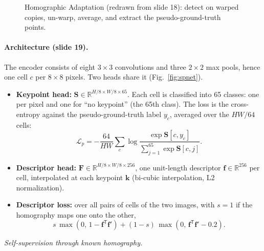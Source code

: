 \documentclass[11pt,a4paper]{article}
\newcommand{\R}{\mathbb{R}}
\newcommand{\tr}{^{\mathsf T}}
\newcommand{\y}{\bm{y}}
\theoremstyle{definition}
\theoremstyle{plain}
\theoremstyle{remark}
\begin{document}
\begin{figure}[H]
\centering
{}
\caption{Homographic Adaptation (redrawn from slide 18): detect on warped copies, un-warp, average, and extract the pseudo-ground-truth points.}
\end{figure}

\paragraph{Architecture (slide 19).}
The encoder consists of eight $3\times3$ convolutions and three $2\times2$ max pools, hence one cell $c$ per $8\times8$ pixels. Two heads share it
(Fig.~\ref{fig:spnet}).
\begin{itemize}
\item \textbf{Keypoint head:} $\bm S\in\R^{H/8\times W/8\times 65}$. Each cell is classified into 65 classes: one per pixel and one for ``no keypoint''
 (the 65th class). The loss is the cross-entropy against the pseudo-ground-truth label $y_c$, averaged over the $HW/64$ cells:
 \[
 \mathcal L_p=-\frac{64}{HW}\sum_c\log\frac{\exp\bm S[c,y_c]}{\sum_{j=1}^{65}\exp\bm S[c,j]} .
 \]
\item \textbf{Descriptor head:} $\bm F\in\R^{H/8\times W/8\times256}$, one unit-length descriptor $\bm f\in\R^{256}$ per cell, interpolated at each
 keypoint $\bm k$ (bi-cubic interpolation, L2 normalization).
\item \textbf{Descriptor loss:} over all pairs of cells of the two images, with $s=1$ if the homography maps one onto the other,
 \[
 s\,\max(0,\,1-\bm f\tr\bm f')+(1-s)\,\max(0,\,\bm f\tr\bm f'-0.2).
 \]
\end{itemize}
\emph{Self-supervision through known homography.}
\end{document}
